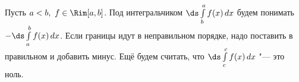 
    	Пусть $a<b,\ f\in\Rim[a,b]$. Под интегральчиком $\ds\int\limits_b^af(x)\,dx$ будем понимать
    	$-\ds\int\limits_a^bf(x)\,dx$.
    	Если границы идут в неправильном порядке, надо поставить в правильном и добавить минус.
    	Ещё будем считать, что $\ds\int\limits_c^cf(x)\,dx$ "--- это ноль.
    